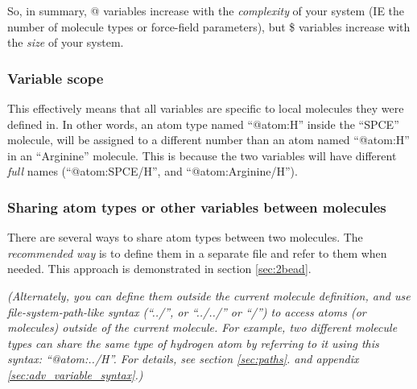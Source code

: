 \documentclass[11pt]{article}
\begin{document}
So, in summary, @ variables increase with the \textit{complexity} 
of your system
(IE the number of molecule types or force-field parameters), 
but \$ variables increase with the \textit{size} of your system.

\subsubsection{Variable scope}
\label{sec:variable_scope}
This effectively means that all variables are specific to
local molecules they were defined in.
In other words, an atom type named ``@atom:H'' inside 
the ``SPCE'' molecule, will be assigned to a different number
than an atom named ``@atom:H'' in an ``Arginine'' molecule.
This is because the two variables will have different \textit{full} names
(``@atom:SPCE/H'', and ``@atom:Arginine/H'').







\subsubsection*{Sharing atom types or other variables between molecules}
There are several ways to share atom types between two molecules.
The \textit{recommended way} is to define them in a separate
file and refer to them when needed.
This approach is demonstrated in section \ref{sec:2bead}.

\textit{(Alternately, you can define them outside the current molecule definition,
and use file-system-path-like syntax 
(``../'', or ``../../'' or ``/'')
to access atoms (or molecules) outside of the current molecule.
For example, two different molecule types can share the same type of
hydrogen atom by referring to it using this syntax: ``@atom:../H''.
For details, see
section \ref{sec:paths}.
and appendix \ref{sec:adv_variable_syntax}.)
}
\end{document}

